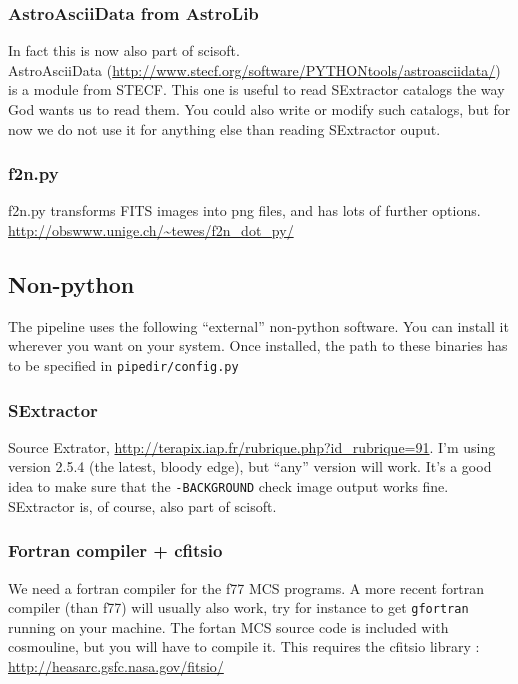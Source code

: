 \subsubsection{AstroAsciiData from AstroLib}

In fact this is now also part of scisoft.\\
AstroAsciiData (\url{http://www.stecf.org/software/PYTHONtools/astroasciidata/}) is a module from STECF. This one is useful to read SExtractor catalogs the way God wants us to read them. You could also write or modify such catalogs, but for now we do not use it for anything else than reading SExtractor ouput.

\subsubsection{f2n.py}

f2n.py transforms FITS images into png files, and has lots of further options.\\
\url{http://obswww.unige.ch/~tewes/f2n_dot_py/}


\subsection{Non-python}

The pipeline uses the following ``external'' non-python software. You can install it wherever you want on your system. Once installed, the path to these binaries has to be specified in \verb+pipedir/config.py+

\subsubsection{SExtractor}
Source Extrator, \url{http://terapix.iap.fr/rubrique.php?id_rubrique=91}. I'm using version 2.5.4 (the latest, bloody edge), but ``any'' version will work. It's a good idea to make sure that the \verb+-BACKGROUND+ check image output works fine. SExtractor is, of course, also part of scisoft.

\subsubsection{Fortran compiler + cfitsio}
We need a fortran compiler for the f77 MCS programs. A more recent fortran compiler (than f77) will usually also work, try for instance to get \verb+gfortran+ running on your machine. The fortan MCS source code is included with cosmouline, but you will have to compile it. This requires the cfitsio library :
\url{http://heasarc.gsfc.nasa.gov/fitsio/}



